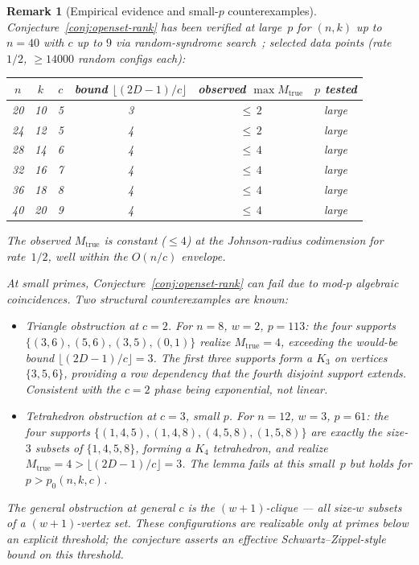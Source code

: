\documentclass[11pt]{article}
\newtheorem{remark}[theorem]{Remark}
\begin{document}
\begin{remark}[Empirical evidence and small-$p$ counterexamples]
\label{rem:phase-diagram-empirics}
Conjecture~\ref{conj:openset-rank} has been verified at large~$p$ for $(n, k)$ up to $n = 40$ with $c$ up to $9$ via random-syndrome search~\cite{Note0094,CompanionRepo}; selected data points (rate~$1/2$, $\geq 14000$ random configs each):
\begin{center}\small
\begin{tabular}{cccccc}
\toprule
$n$ & $k$ & $c$ & bound $\lfloor(2D{-}1)/c\rfloor$ & observed $\max M_{\mathrm{true}}$ & $p$ tested \\
\midrule
20 & 10 & 5 & 3 & ${\leq}\, 2$ & large \\
24 & 12 & 5 & 4 & ${\leq}\, 2$ & large \\
28 & 14 & 6 & 4 & ${\leq}\, 4$ & large \\
32 & 16 & 7 & 4 & ${\leq}\, 4$ & large \\
36 & 18 & 8 & 4 & ${\leq}\, 4$ & large \\
40 & 20 & 9 & 4 & ${\leq}\, 4$ & large \\
\bottomrule
\end{tabular}
\end{center}
The observed $M_{\mathrm{true}}$ is constant ($\leq 4$) at the Johnson-radius codimension for rate~$1/2$, well within the $O(n/c)$ envelope.

\smallskip
At small primes, Conjecture~\ref{conj:openset-rank} can fail due to mod-$p$ algebraic coincidences. Two structural counterexamples are known:
\begin{itemize}[nosep, leftmargin=1.2em]
\item \emph{Triangle obstruction at $c = 2$.} For $n = 8$, $w = 2$, $p = 113$: the four supports $\{(3,6), (5,6), (3,5), (0,1)\}$ realize $M_{\mathrm{true}} = 4$, exceeding the would-be bound $\lfloor (2D - 1)/c \rfloor = 3$. The first three supports form a $K_3$ on vertices $\{3, 5, 6\}$, providing a row dependency that the fourth disjoint support extends. Consistent with the $c = 2$ phase being exponential, not linear.
\item \emph{Tetrahedron obstruction at $c = 3$, small $p$.} For $n = 12$, $w = 3$, $p = 61$: the four supports $\{(1,4,5), (1,4,8), (4,5,8), (1,5,8)\}$ are exactly the size-$3$ subsets of $\{1, 4, 5, 8\}$, forming a $K_4$ tetrahedron, and realize $M_{\mathrm{true}} = 4 > \lfloor (2D - 1)/c \rfloor = 3$. The lemma fails at this small~$p$ but holds for $p > p_0(n, k, c)$.
\end{itemize}
The general obstruction at general $c$ is the $(w{+}1)$-clique --- all size-$w$ subsets of a $(w{+}1)$-vertex set. These configurations are realizable only at primes below an explicit threshold; the conjecture asserts an effective Schwartz--Zippel-style bound on this threshold.
\end{remark}
\end{document}
